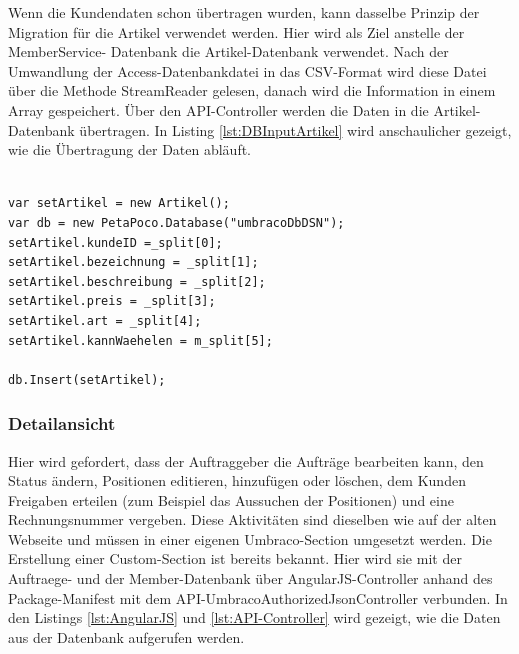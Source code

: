 Wenn die Kundendaten schon übertragen wurden, kann dasselbe Prinzip der Migration für die Artikel verwendet werden. Hier wird als Ziel anstelle der MemberService- Datenbank die Artikel-Datenbank verwendet. Nach der Umwandlung der Access-Datenbankdatei in das CSV-Format wird diese Datei über die Methode StreamReader gelesen, danach wird die Information in einem Array gespeichert. Über den API-Controller werden die Daten in die Artikel-Datenbank übertragen. In Listing \ref{lst:DBInputArtikel} wird anschaulicher gezeigt, wie die Übertragung der Daten abläuft.

\begin{lstlisting}[caption={Datenbank "Artikel" - Transfer}, label=lst:DBInputArtikel]

var setArtikel = new Artikel();
var db = new PetaPoco.Database("umbracoDbDSN");
setArtikel.kundeID =_split[0];
setArtikel.bezeichnung = _split[1];
setArtikel.beschreibung = _split[2];
setArtikel.preis = _split[3];
setArtikel.art = _split[4];
setArtikel.kannWaehelen = m_split[5];

db.Insert(setArtikel);
\end{lstlisting}

\subsubsection{Detailansicht}

Hier wird gefordert, dass der Auftraggeber die Aufträge bearbeiten kann, den Status ändern, Positionen editieren, hinzufügen oder löschen, dem Kunden Freigaben erteilen (zum Beispiel das Aussuchen der Positionen) und eine Rechnungsnummer vergeben. Diese Aktivitäten sind dieselben wie auf der alten Webseite und müssen in einer eigenen Umbraco-Section umgesetzt werden.
Die Erstellung einer Custom-Section ist bereits bekannt. Hier wird sie mit der Auftraege- und der Member-Datenbank über AngularJS-Controller anhand des Package-Manifest mit dem API-UmbracoAuthorizedJsonController verbunden. In den Listings \ref{lst:AngularJS} und \ref{lst:API-Controller} wird gezeigt, wie die Daten aus der Datenbank aufgerufen werden.


